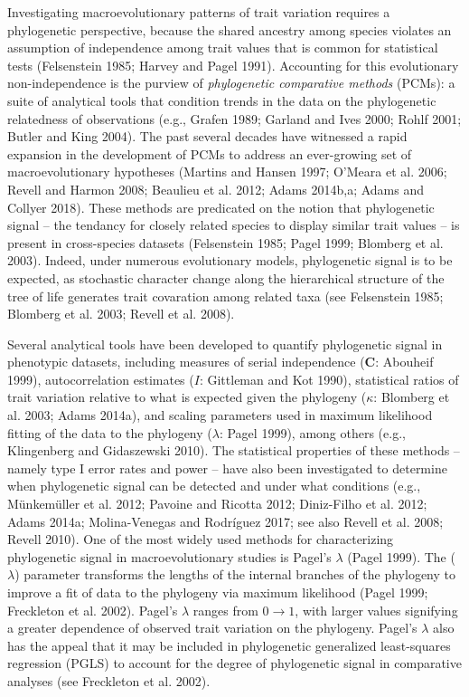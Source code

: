 \documentclass[]{article}
\begin{document}
Investigating macroevolutionary patterns of trait variation requires a
phylogenetic perspective, because the shared ancestry among species
violates an assumption of independence among trait values that is common
for statistical tests (Felsenstein 1985; Harvey and Pagel 1991).
Accounting for this evolutionary non-independence is the purview of
\emph{phylogenetic comparative methods} (PCMs): a suite of analytical
tools that condition trends in the data on the phylogenetic relatedness
of observations (e.g., Grafen 1989; Garland and Ives 2000; Rohlf 2001;
Butler and King 2004). The past several decades have witnessed a rapid
expansion in the development of PCMs to address an ever-growing set of
macroevolutionary hypotheses (Martins and Hansen 1997; O'Meara et al.
2006; Revell and Harmon 2008; Beaulieu et al. 2012; Adams 2014b,a; Adams
and Collyer 2018). These methods are predicated on the notion that
phylogenetic signal -- the tendancy for closely related species to
display similar trait values -- is present in cross-species datasets
(Felsenstein 1985; Pagel 1999; Blomberg et al. 2003). Indeed, under
numerous evolutionary models, phylogenetic signal is to be expected, as
stochastic character change along the hierarchical structure of the tree
of life generates trait covaration among related taxa (see Felsenstein
1985; Blomberg et al. 2003; Revell et al. 2008). \hfill\break

Several analytical tools have been developed to quantify phylogenetic
signal in phenotypic datasets, including measures of serial independence
(\(\mathbf{C}\): Abouheif 1999), autocorrelation estimates (\(I\):
Gittleman and Kot 1990), statistical ratios of trait variation relative
to what is expected given the phylogeny (\(\kappa\): Blomberg et al.
2003; Adams 2014a), and scaling parameters used in maximum likelihood
fitting of the data to the phylogeny (\(\lambda\): Pagel 1999), among
others (e.g., Klingenberg and Gidaszewski 2010). The statistical
properties of these methods -- namely type I error rates and power --
have also been investigated to determine when phylogenetic signal can be
detected and under what conditions (e.g., Münkemüller et al. 2012;
Pavoine and Ricotta 2012; Diniz-Filho et al. 2012; Adams 2014a;
Molina-Venegas and Rodríguez 2017; see also Revell et al. 2008; Revell
2010). One of the most widely used methods for characterizing
phylogenetic signal in macroevolutionary studies is Pagel's \(\lambda\)
(Pagel 1999). The (\(\lambda\)) parameter transforms the lengths of the
internal branches of the phylogeny to improve a fit of data to the
phylogeny via maximum likelihood (Pagel 1999; Freckleton et al. 2002).
Pagel's \(\lambda\) ranges from \(0\to1\), with larger values signifying
a greater dependence of observed trait variation on the phylogeny.
Pagel's \(\lambda\) also has the appeal that it may be included in
phylogenetic generalized least-squares regression (PGLS) to account for
the degree of phylogenetic signal in comparative analyses (see
Freckleton et al. 2002). \hfill\break 
\end{document}
